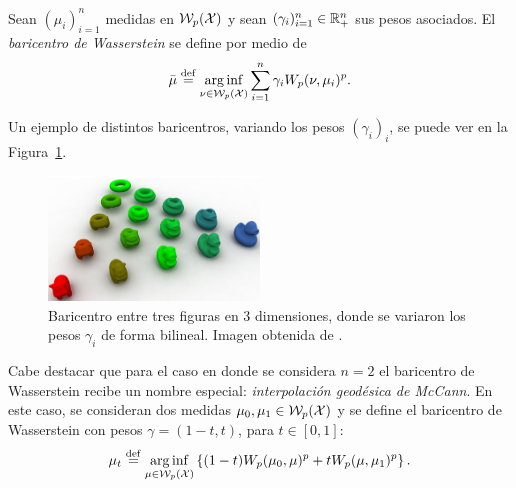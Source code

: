 \begin{definition}\label{def:baricentroWasserstein}
	Sean $(\mu_{i})_{i=1}^{n}$ medidas en $\WassersteinSpace[p]{\cX} $ y sean $(\gamma_{i})_{i=1}^{n} \in \R_+^n$ sus pesos asociados. El \emph{baricentro de Wasserstein} se define por medio de
	\begin{equation}
		\bar \mu \eqdef \arginf_{\nu \in \WassersteinSpace[p]{\cX} } \sum_{i=1}^{n} \gamma_i \Wasserstein[p]{\nu}{\mu_i}^p.
	\end{equation}

\end{definition}

Un ejemplo de distintos baricentros, variando los pesos $(\gamma_i)_i$, se puede ver en la Figura~\ref{fig:baricentro-Wass-3d}.

\begin{figure}[htbp]
	\centering
	\includegraphics[width=0.5\textwidth]{img/transporte/baricentro-Wass-3d.png}
	\caption{Baricentro entre tres figuras en 3 dimensiones, donde se variaron los pesos $\gamma_i$ de forma bilineal. Imagen obtenida de \cite{solomon2015convolutional}.}
	\label{fig:baricentro-Wass-3d}
\end{figure}


Cabe destacar que para el caso en donde se considera $n = 2$ el baricentro de Wasserstein recibe un nombre especial: \textit{interpolación geodésica de McCann}. En este caso, se consideran dos medidas $\mu_0, \mu_1 \in \WassersteinSpace[p]{\cX} $ y se define el baricentro de Wasserstein con pesos $\gamma = (1 - t, t)$, para $t \in [0, 1]$:
\begin{equation}\label{eq:interpolacion-geodesica}
	\mu_t \eqdef \arginf_{\mu \in \WassersteinSpace[p]{\cX} } \left\{ (1-t) \Wasserstein[p]{\mu_0}{\mu}^p + t \Wasserstein[p]{\mu}{\mu_1}^p \right\}.
\end{equation}




